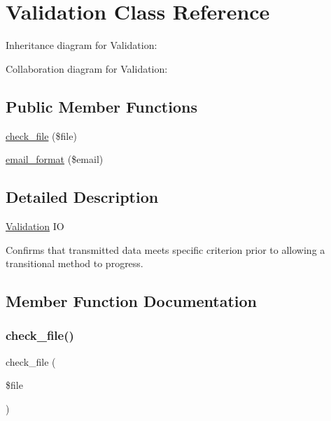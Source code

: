 \hypertarget{class_w_a_f_f_l_e_1_1_framework_1_1_i_o_1_1_validation}{}\section{Validation Class Reference}
\label{class_w_a_f_f_l_e_1_1_framework_1_1_i_o_1_1_validation}


Inheritance diagram for Validation\+:


Collaboration diagram for Validation\+:
\subsection*{Public Member Functions}
\begin{DoxyCompactItemize}
\item 
\hyperlink{class_w_a_f_f_l_e_1_1_framework_1_1_i_o_1_1_validation_a4ff84cc981fb60ee42f19420441e8d7b}{check\+\_\+file} (\$file)
\item 
\hyperlink{class_w_a_f_f_l_e_1_1_framework_1_1_i_o_1_1_validation_a93629f2b411f25d13fac77a36470fbae}{email\+\_\+format} (\$email)
\end{DoxyCompactItemize}


\subsection{Detailed Description}
\hyperlink{class_w_a_f_f_l_e_1_1_framework_1_1_i_o_1_1_validation}{Validation} IO

Confirms that transmitted data meets specific criterion prior to allowing a transitional method to progress. 

\subsection{Member Function Documentation}
\mbox{\label{class_w_a_f_f_l_e_1_1_framework_1_1_i_o_1_1_validation_a4ff84cc981fb60ee42f19420441e8d7b}} 
\subsubsection{\texorpdfstring{check\+\_\+file()}{check\_file()}}
{\footnotesize\ttfamily check\+\_\+file (\begin{DoxyParamCaption}\item[{}]{\$file }\end{DoxyParamCaption})}

